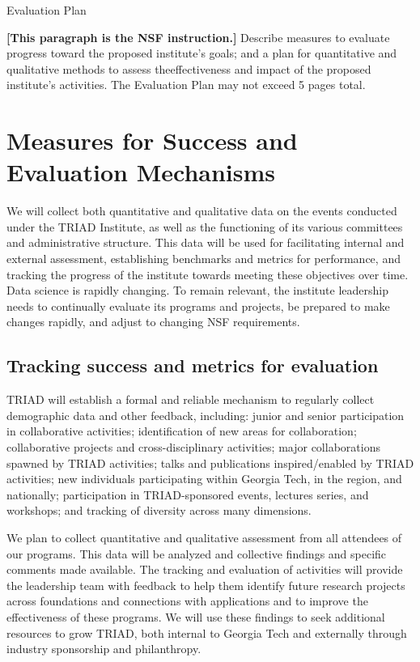\documentclass[12pt]{article}
\newcommand{\shrink}{\def\baselinestretch{0.90}\large\normalsize}
\begin{document}


\pagestyle{plain}
\normalbaselineskip=10.0pt



\begin{center}
Evaluation Plan
\end{center}

{\bf [This paragraph is the NSF instruction.]}
Describe measures to evaluate progress toward the proposed institute's goals; and a plan for quantitative and qualitative methods to assess theeffectiveness and impact of the proposed institute's activities. The Evaluation Plan may not exceed 5 pages total.

\section{Measures for Success and Evaluation Mechanisms}
We will collect both quantitative and qualitative data on the events conducted under the TRIAD Institute, as well as the functioning of its various committees and administrative structure. This data will be used for facilitating internal and external assessment, establishing benchmarks and metrics for performance, and tracking the progress of the institute towards meeting these objectives over time. Data science is rapidly changing.
To remain relevant, the institute leadership needs to continually evaluate its programs and projects, be prepared to make changes rapidly, and adjust to changing NSF requirements.

\subsection{Tracking success and metrics for evaluation}
\label{sec:metric}
TRIAD will establish a formal and reliable mechanism to regularly collect demographic data and other feedback, including:
junior and senior participation in collaborative activities;
 identification of new areas for collaboration;
collaborative projects and cross-disciplinary activities;
major collaborations spawned by TRIAD activities;
 talks and publications inspired/enabled by TRIAD activities;
new individuals participating within Georgia Tech, in the region, and nationally;
participation in TRIAD-sponsored events, lectures series, and workshops;
and tracking of diversity across many dimensions.

We  plan to collect quantitative and qualitative assessment from all attendees of our programs.
This data will be analyzed and collective findings and specific comments made available. The tracking and evaluation of activities will provide the leadership team with feedback to help them identify future research projects across foundations and connections with applications and to improve the effectiveness of these programs. We will use these findings to seek additional resources to grow TRIAD, both internal to Georgia Tech and externally through industry sponsorship and philanthropy.
\end{document}

